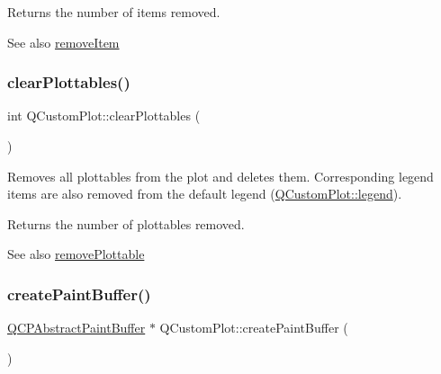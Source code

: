 Returns the number of items removed.

\begin{DoxySeeAlso}{See also}
\mbox{\hyperlink{class_q_custom_plot_ae04446557292551e8fb6e2c106e1848d}{remove\+Item}} 
\end{DoxySeeAlso}
\mbox{\label{class_q_custom_plot_a9a409bb3201878adb7ffba1c89c4e004}} 
\subsubsection{\texorpdfstring{clearPlottables()}{clearPlottables()}}
{\footnotesize\ttfamily int Q\+Custom\+Plot\+::clear\+Plottables (\begin{DoxyParamCaption}{ }\end{DoxyParamCaption})}

Removes all plottables from the plot and deletes them. Corresponding legend items are also removed from the default legend (\mbox{\hyperlink{class_q_custom_plot_a4eadcd237dc6a09938b68b16877fa6af}{Q\+Custom\+Plot\+::legend}}).

Returns the number of plottables removed.

\begin{DoxySeeAlso}{See also}
\mbox{\hyperlink{class_q_custom_plot_af3dafd56884208474f311d6226513ab2}{remove\+Plottable}} 
\end{DoxySeeAlso}
\mbox{\label{class_q_custom_plot_a943b57596a1adf7f0e75c3b50e407ae6}} 
\subsubsection{\texorpdfstring{createPaintBuffer()}{createPaintBuffer()}}
{\footnotesize\ttfamily \mbox{\hyperlink{class_q_c_p_abstract_paint_buffer}{Q\+C\+P\+Abstract\+Paint\+Buffer}} $\ast$ Q\+Custom\+Plot\+::create\+Paint\+Buffer (\begin{DoxyParamCaption}{ }\end{DoxyParamCaption})\hspace{0.3cm}{\ttfamily [protected]}}

\mbox{\label{class_q_custom_plot_a0421d647f420b0b4c57aec1708857af5}} 
